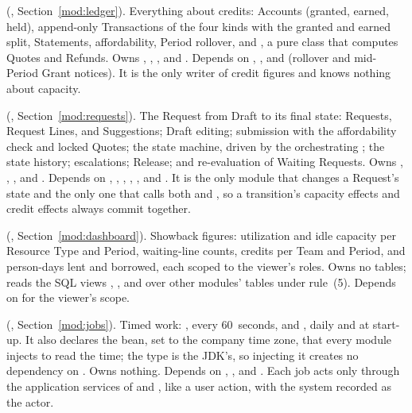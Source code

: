 \textbf{} (, Section~\ref{mod:ledger}). Everything about credits: Accounts (granted, earned, held), append-only Transactions of the four kinds with the granted and earned split, Statements, affordability, Period rollover, and , a pure class that computes Quotes and Refunds. Owns , , , and . Depends on , , and  (rollover and mid-Period Grant notices). It is the only writer of credit figures and knows nothing about capacity.

\textbf{} (, Section~\ref{mod:requests}). The Request from Draft to its final state: Requests, Request Lines, and Suggestions; Draft editing; submission with the affordability check and locked Quotes; the state machine, driven by the orchestrating ; the state history; escalations; Release; and re-evaluation of Waiting Requests. Owns , , , and . Depends on , , , , , and . It is the only module that changes a Request's state and the only one that calls both  and , so a transition's capacity effects and credit effects always commit together.

\textbf{} (, Section~\ref{mod:dashboard}). Showback figures: utilization and idle capacity per Resource Type and Period, waiting-line counts, credits per Team and Period, and person-days lent and borrowed, each scoped to the viewer's roles. Owns no tables; reads the SQL views , , and  over other modules' tables under rule~(5). Depends on  for the viewer's scope.

\textbf{} (, Section~\ref{mod:jobs}). Timed work: , every 60~seconds, and , daily and at start-up. It also declares the  bean, set to the company time zone, that every module injects to read the time; the type is the JDK's, so injecting it creates no dependency on . Owns nothing. Depends on , , and . Each job acts only through the application services of  and , like a user action, with the system recorded as the actor.

